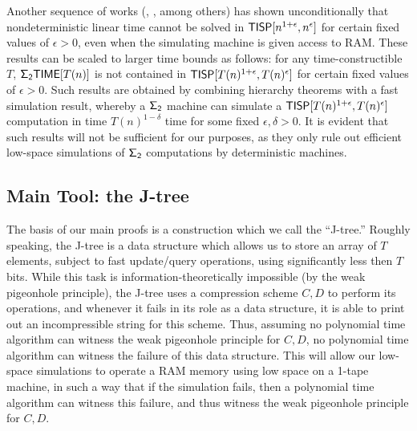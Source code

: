 Another sequence of works (\cite{fortnow}, \cite{tisp-sat}, \cite{williams-tisp} among others) has shown unconditionally that nondeterministic linear time cannot be solved in $\cl{TISP}[n^{1+\epsilon}, n^{\epsilon}]$ for certain fixed values of $\epsilon>0$, even when the simulating machine is given access to RAM. These results can be scaled to larger time bounds as follows: for any time-constructible $T$, $\cl{\Sigma_2 TIME}[T(n)]$ is not contained in $\cl{TISP}[T(n)^{1+\epsilon}, T(n)^{\epsilon}]$ for certain fixed values of $\epsilon>0$. Such results are obtained by combining hierarchy theorems with a fast simulation result, whereby a $\cl{\Sigma_2}$ machine can simulate a $\cl{TISP}[T(n)^{1+\epsilon}, T(n)^{\epsilon}]$ computation in time $T(n)^{1 - \delta}$ time for some fixed $\epsilon, \delta > 0$. It is evident that such results will not be sufficient for our purposes, as they only rule out efficient low-space simulations of $\cl{\Sigma_2}$ computations by deterministic machines.


\subsection{Main Tool: the J-tree}
The basis of our main proofs is a construction which we call the ``J-tree.'' Roughly speaking, the J-tree is a data structure which allows us to store an array of $T$ elements, subject to fast update/query operations, using significantly less then $T$ bits. While this task is information-theoretically impossible (by the weak pigeonhole principle), the J-tree uses a compression scheme $C,D$ to perform its operations, and whenever it fails in its role as a data structure, it is able to print out an incompressible string for this scheme. Thus, assuming no polynomial time algorithm can witness the weak pigeonhole principle for $C,D$, no polynomial time algorithm can witness the failure of this data structure. This will allow our low-space simulations to operate a RAM memory using low space on a 1-tape machine, in such a way that if the simulation fails, then a polynomial time algorithm can witness this failure, and thus witness the weak pigeonhole principle for $C,D$.

